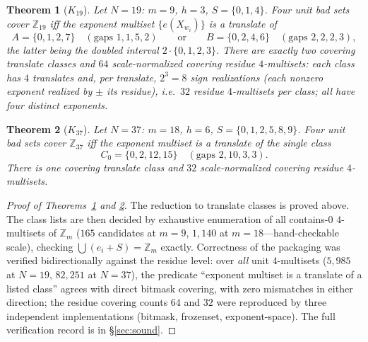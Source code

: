 \documentclass[11pt,a4paper]{article}
\numberwithin{equation}{section}
\theoremstyle{plain}
\newtheorem{theorem}{Theorem}[section]
\theoremstyle{definition}
\theoremstyle{remark}
\newcommand{\Z}{\mathbb{Z}}
\begin{document}
\begin{theorem}[$K_{19}$]\label{thm:K19}
Let $N=19$: $m=9$, $h=3$, $S=\{0,1,4\}$. Four unit bad sets cover
$\Z_{19}$ iff the exponent multiset $\{e(X_{w_i})\}$ is a translate of
\[
A=\{0,1,2,7\}\quad(\text{gaps }1,1,5,2)
\qquad\text{or}\qquad
B=\{0,2,4,6\}\quad(\text{gaps }2,2,2,3),
\]
the latter being the doubled interval $2\cdot\{0,1,2,3\}$. There are
exactly two covering translate classes and $64$ scale-normalized covering
residue $4$-multisets: each class has $4$ translates and, per translate,
$2^3=8$ sign realizations (each nonzero exponent realized by $\pm$ its
residue), i.e.\ $32$ residue $4$-multisets per class; all have four
distinct exponents.
\end{theorem}

\begin{theorem}[$K_{37}$]\label{thm:K37}
Let $N=37$: $m=18$, $h=6$, $S=\{0,1,2,5,8,9\}$. Four unit bad sets cover
$\Z_{37}$ iff the exponent multiset is a translate of the single class
\[
C_0=\{0,2,12,15\}\quad(\text{gaps }2,10,3,3).
\]
There is one covering translate class and $32$ scale-normalized covering
residue $4$-multisets.
\end{theorem}

\begin{proof}[Proof of Theorems~\ref{thm:K19} and \ref{thm:K37}]
The reduction to translate classes is proved above. The class lists are
then decided by exhaustive enumeration of all contains-$0$ $4$-multisets
of $\Z_m$ ($165$ candidates at $m=9$, $1{,}140$ at $m=18$---hand-checkable
scale), checking $\bigcup(e_i+S)=\Z_m$ exactly. Correctness of the
packaging was verified bidirectionally against the residue level: over
\emph{all} unit $4$-multisets ($5{,}985$ at $N=19$, $82{,}251$ at
$N=37$), the predicate ``exponent multiset is a translate of a listed
class'' agrees with direct bitmask covering, with zero mismatches in
either direction; the residue covering counts $64$ and $32$ were
reproduced by three independent implementations (bitmask, frozenset,
exponent-space). The full verification record is in \S\ref{sec:sound}.
\end{proof}
\end{document}

